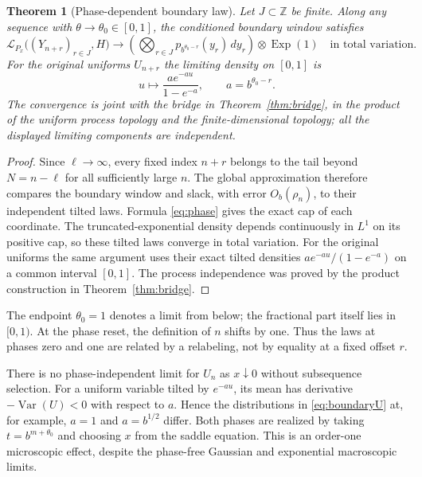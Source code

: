 \documentclass[11pt,letterpaper]{article}
\numberwithin{equation}{section}
\newtheorem{theorem}{Theorem}[section]
\theoremstyle{definition}
\theoremstyle{remark}
\newcommand{\ZZ}{\mathbb Z}
\newcommand{\Law}{\mathcal L}
\newcommand{\Exp}{\operatorname{Exp}}
\newcommand{\Var}{\operatorname{Var}}
\begin{document}
\begin{theorem}[Phase-dependent boundary law]
\label{thm:boundary}
Let $J\subset\ZZ$ be finite. Along any sequence with
$\theta\to\theta_0\in[0,1]$, the conditioned boundary window satisfies
\begin{equation}
 \Law_{P_x}\big((Y_{n+r})_{r\in J},H\big)
 \longrightarrow
 \left(\bigotimes_{r\in J}p_{b^{\theta_0-r}}(y_r)\,dy_r\right)
 \otimes\Exp(1)
 \quad\text{in total variation}.
 \label{eq:boundary}
\end{equation}
For the original uniforms $U_{n+r}$ the limiting density on $[0,1]$ is
\begin{equation}
 u\longmapsto
 \frac{a e^{-au}}{1-e^{-a}},\qquad a=b^{\theta_0-r}.
 \label{eq:boundaryU}
\end{equation}
The convergence is joint with the bridge in Theorem~\ref{thm:bridge}, in the
product of the uniform process topology and the finite-dimensional topology;
all the displayed limiting components are independent.
\end{theorem}
\begin{proof}
Since $\ell\to\infty$, every fixed index $n+r$ belongs to the tail beyond
$N=n-\ell$ for all sufficiently large $n$. The global approximation therefore
compares the boundary window and slack, with error $O_b(\rho_n)$, to their
independent tilted laws. Formula \eqref{eq:phase} gives the exact cap of each
coordinate. The truncated-exponential density depends continuously in $L^1$
on its positive cap, so these tilted laws converge in total variation.
For the original uniforms the same argument uses their exact tilted densities
$a e^{-au}/(1-e^{-a})$ on a common interval $[0,1]$. The process independence
was proved by the product construction in Theorem~\ref{thm:bridge}.
\end{proof}

The endpoint $\theta_0=1$ denotes a limit from below; the fractional part
itself lies in $[0,1)$. At the phase reset, the definition of $n$ shifts by
one. Thus the laws at phases zero and one are related by a relabeling, not
by equality at a fixed offset $r$.

There is no phase-independent limit for $U_n$ as $x\downarrow0$ without
subsequence selection. For a uniform variable tilted by $e^{-au}$, its mean
has derivative $-\Var(U)<0$ with respect to $a$. Hence the distributions in
\eqref{eq:boundaryU} at, for example, $a=1$ and $a=b^{1/2}$ differ. Both
phases are realized by taking $t=b^{m+\theta_0}$ and choosing $x$ from the
saddle equation. This is an order-one microscopic effect, despite the
phase-free Gaussian and exponential macroscopic limits.
\end{document}

